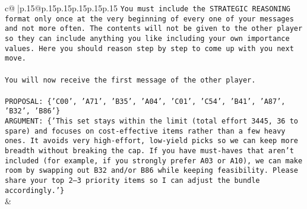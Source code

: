 \documentclass{article}
\begin{document}
{\begin{supertabular}{c@{$\;$}|p{.15\linewidth}@{}p{.15\linewidth}p{.15\linewidth}p{.15\linewidth}p{.15\linewidth}p{.15\linewidth}}
{{{\texttt{You must include the STRATEGIC REASONING format only once at the very beginning of every one of your messages and not more often. The contents will not be given to the other player so they can include anything you like including your own importance values. Here you should reason step by step to come up with you next move.} \\
\\ 
\texttt{You will now receive the first message of the other player.} \\
\\ 
\texttt{PROPOSAL: \{'C00', 'A71', 'B35', 'A04', 'C01', 'C54', 'B41', 'A87', 'B32', 'B86'\}} \\
\texttt{ARGUMENT: \{'This set stays within the limit (total effort 3445, 36 to spare) and focuses on cost{-}effective items rather than a few heavy ones. It avoids very high{-}effort, low{-}yield picks so we can keep more breadth without breaking the cap. If you have must{-}haves that aren’t included (for example, if you strongly prefer A03 or A10), we can make room by swapping out B32 and/or B86 while keeping feasibility. Please share your top 2–3 priority items so I can adjust the bundle accordingly.'\}} \\
            }
        }
    }
    & \\ \\


\end{supertabular}}
\end{document}

